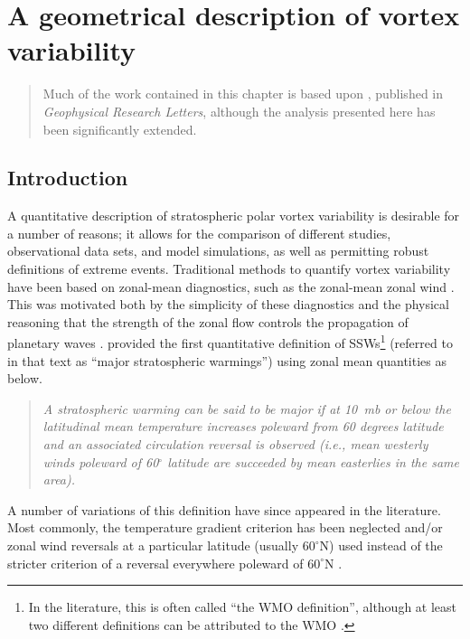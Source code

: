 \chapter{A geometrical description of vortex variability}
\begin{quotation}
  Much of the work contained in this chapter is based upon \citet{Seviour2013},
  published in \emph{Geophysical Research Letters}, although the analysis
  presented here has been significantly extended.
\end{quotation}

\label{cha:moments}




\section{Introduction}
\label{sec:moments-introduction}
A quantitative description of stratospheric polar vortex variability is
desirable for a number of reasons; it allows for the comparison of different
studies, observational data sets, and model simulations, as well as permitting
robust definitions of extreme events.  Traditional methods to quantify vortex
variability have been based on zonal-mean diagnostics, such as the zonal-mean
zonal wind \citep[e.g.,][]{Andrews1987}. This was motivated both by the
simplicity of these diagnostics and the physical reasoning that the strength of
the zonal flow controls the propagation of planetary waves \citep[][Section
\ref{sec:plan-waves-strat}]{Charney1961}. \citet{McInturff1978} provided the
first quantitative definition of SSWs\footnote{In the literature, this is often
  called ``the WMO definition'', although at least two different definitions can
  be attributed to the WMO \citep{Butler2014a}.} (referred to in that text as
``major stratospheric warmings'') using zonal mean quantities as below.
\begin{quotation}
\emph{A stratospheric warming can be said to be major if at 10~mb or below the
latitudinal mean temperature increases poleward from 60 degrees latitude and an
associated circulation reversal is observed (i.e., mean westerly winds poleward
of 60$^{\circ}$ latitude are succeeded by mean easterlies in the same area).}
\end{quotation}
A number of variations of this definition have since appeared in the
literature. Most commonly, the temperature gradient criterion has been neglected
and/or zonal wind reversals at a particular latitude (usually $60^{\circ}$N)
used instead of the stricter criterion of a reversal everywhere poleward of
$60^{\circ}$N \citep[e.g.,][]{Labitzke2000, Christiansen2001,
  Reichler2012}. 

